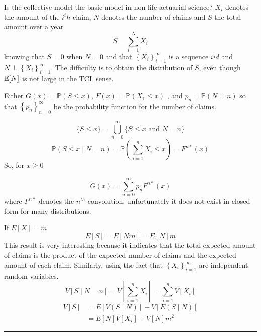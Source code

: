 \begin{f}
Is the collective model the basic model in non-life actuarial science?
	 \(X_{i}\) denotes the amount of the \(i^th\) claim, \(N\) denotes the number of claims and \(S\) the total amount over a year
	\[
	S=\sum_{i=1}^{N} X_{i}
	\]
	knowing that \(S=0\) when \(N=0\) and that \(\left\{X_{i}\right\}_{i=1}^{\infty}\) is a sequence \(iid\) and  \(N \perp \left\{X_{i}\right\}_{i=1}^{\infty}\). 
The difficulty is to obtain the distribution of \(S\), even though \(\mathbb{E} [N]\) is not large in the TCL sense.
\end{f}


\begin{f}
	
Either \(G(x)=\mathbb{P}(S \leq x)\), \(F(x)=\mathbb{P}\left(X_{1} \leq x\right)\) , and \(p_{n}=\mathbb{P}(N=n)\) so that \(\left\{p_{n}\right\}_{n=0}^{\infty}\) be the probability function for the number of claims.
	
	\[
	\{S \leq x\}=\bigcup_{n=0}^{\infty}\{S \leq x \text { and } N=n\}
	\]
	\[
	\mathbb{P}(S \leq x \mid N=n)=\mathbb{P}\left(\sum_{i=1}^{n} X_{i} \leq x\right)=F^{n *}(x)
	\]
	So, for \(x \geq 0\)
	
	\begin{equation*}\label{GxCollectif}
		G(x)=\sum_{n=0}^{\infty} p_{n} F^{n *}(x)
	\end{equation*}
	where \(F^{n *}\) denotes the \(n^{th}\) convolution, unfortunately it does not exist in closed form for many distributions.
	
If \(E[X]=m\)
	\[
	E[S]=E\left[N m\right]=E[N] m
	\]
	This result is very interesting because it indicates that the total expected amount of claims is the product of the expected number of claims and the expected amount of each claim. Similarly, using the fact that \(\left\{X_{i}\right\}_{i=1}^{\infty}\) are independent random variables,
	\[
	V[S \mid N=n]=V\left[\sum_{i=1}^{n} X_{i}\right]=\sum_{i=1}^{n} V\left[X_{i}\right]
	\]
	\[
	\begin{aligned}
		V[S] &=E[V(S \mid N)]+V[E(S \mid N)] \\
		&=E[N] V\left[X_{i}\right]+V[N] m^{2}
	\end{aligned}
	\]    
\end{f}

\hrule


